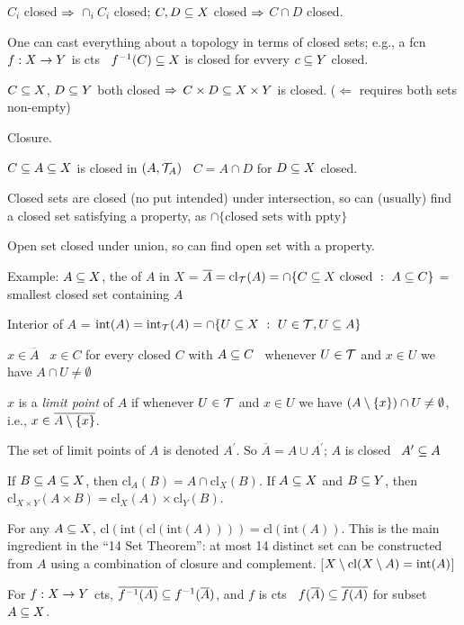 \documentclass[12pt]{article}
\begin{document}
$C_i$ closed $\Rightarrow$ $\cap_i C_i$ closed; $C,D\subseteq X$ closed $\Rightarrow$ $C\cap D$ closed.

One can cast everything about a topology in terms of closed sets; e.g., a fcn
$f:X\rightarrow Y$ is cts \lra\ $f^{-1}(C)\subseteq X$ is closed for evvery $c\subseteq Y$ closed.

$C\subseteq X$, $D\subseteq Y$ both closed $\Rightarrow$ $C\times D\subseteq X\times Y$ is closed.
($\Leftarrow$ requires both sets non-empty)

\msk

Closure.

$C\subseteq A\subseteq X$ is closed in $(A,{\mathcal T}_A)$ \lra\ $C=A\cap D$ for $D\subseteq X$ closed.

Closed sets are closed (no put intended) under intersection, so can (usually) find a
 closed set satisfying a property, as $\cap\{\textrm{closed sets with ppty}\}$

Open set closed under union, so can find  open set with a property.

Example: $A\subseteq X$, the  of $A$ in $X$ = 
$\overline{A}=\textrm{cl}_{\mathcal T}(A) = \cap\{C\subseteq X\ \textrm{closed}\ :\ A\subseteq C\}$
= smallest closed set containing $A$

Interior of $A$ = $\textrm{int}(A) = \textrm{int}_{\mathcal T}(A) = \cap\{U\subseteq X\ :\ U\in{\mathcal T}, U\subseteq A\}$

$x\in\overline{A}$ \lra\ $x\in C$ for every closed $C$ with $A\subseteq C$
\lra\ whenever $U\in{\mathcal T}$ and $x\in U$ we have $A\cap U\neq\emptyset$

$x$ is a {\it limit point} of $A$ if  
whenever $U\in{\mathcal T}$ and $x\in U$ we have $(A\setminus\{x\})\cap U\neq\emptyset$, i.e., 
$x\in\overline{A\setminus\{x\}}$. 

The set of limit points of $A$ is denoted $A^\prime$.
So $\overline{A} = A\cup A^\prime$; $A$ is closed \lra\ $A^\prime\subseteq A$

If $B\subseteq A\subseteq X$, then $\textrm{cl}_A(B) = A\cap\textrm{cl}_X(B)$.
If $A\subseteq X$ and $B\subseteq Y$, then 
$\textrm{cl}_{X\times Y}(A\times B) = \textrm{cl}_X(A)\times\textrm{cl}_Y(B)$.

For any $A\subseteq X$, $\textrm{cl}(\textrm{int}(\textrm{cl}(\textrm{int}(A)))) = 
\textrm{cl}(\textrm{int}(A))$. This is the main ingredient in the ``14 Set Theorem'':
at most 14 distinct set can be constructed from $A$ using a combination of closure and 
complement. [$X\setminus\textrm{cl}(X\setminus A) = \textrm{int}(A)$]

For $f:X\rightarrow Y$ cts, $\overline{f^{-1}(A)}\subseteq f^{-1}(\overline{A})$, and
$f$ is cts \lra\ $f(\overline{A})\subseteq \overline{f(A)}$ for 
subset $A\subseteq X$.
\end{document}
